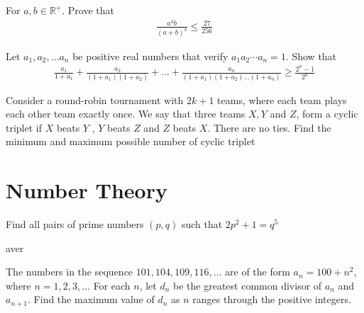 \begin{problem}[Q][5][Pathfinder]
    For $a,b \in \mathbb{R}^+$. Prove that 
    \begin{align*}
        \frac{a^3b}{(a+b)^4} \leq \frac{27}{256}
    \end{align*}
\end{problem}

\begin{problem}
    Let $a_1,a_2,\ldots a_n$ be positive real numbers that verify $a_1a_2 \cdots a_n=1$. Show that 
    \begin{align*}
        \frac{a_1}{1+a_1}+\frac{a_2}{(1+a_1)(1+a_2)}+\ldots+\frac{a_n}{(1+a_1)(1+a_2) \ldots (1+a_n)} \geq \frac{2^n-1}{2^n}
    \end{align*}
\end{problem}

\begin{problem}
    Consider a round-robin tournament with $2k + 1$ teams, where each team plays each other team exactly once. We say that three teams $X, Y$ and $Z$, form a cyclic triplet if $X$ beats $Y$ , $Y$ beats $Z$ and $Z$ beats $X$. There are no ties. Find the minimum and maximum possible number of cyclic triplet
\end{problem}


\newpage
\thispagestyle{firstpageheader}
\section{Number Theory}

\begin{problem}[N][1]
    Find all pairs of prime numbers $(p,q)$ such that $2p^2+1=q^5$
\end{problem}

\begin{solution}
    aver
\end{solution}

\begin{problem}[N][4][AIME 1985]
    The numbers in the sequence $101, 104, 109,116, . . .$ are of the form $a_n = 100+n^2$, where $n = 1,2,3,\ldots$ For each $n$, let $d_n$ be the greatest common divisor of $a_n$ and $a_{n+1}$. Find the maximum value of $d_n$ as $n$ ranges through the positive integers.
\end{problem}


